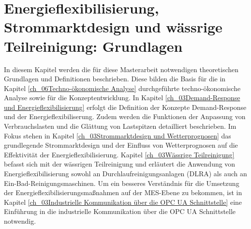 \chapter{Energieflexibilisierung, Strommarktdesign und wässrige Teilreinigung: Grundlagen}
\label{ch_03Energieflexibilisierung, Strommarktdesign und wässrige Teilreinigung: Grundlagen}

In diesem Kapitel werden die für diese Masterarbeit notwendigen theoretischen Grundlagen und Definitionen beschrieben. Diese bilden die Basis für die in Kapitel \ref{ch_06Techno-ökonomische Analyse} durchgeführte techno-ökonomische Analyse sowie für die Konzeptentwicklung. In Kapitel \ref{ch_03Demand-Response und Energieflexibilisierung} erfolgt die Definition der Konzepte Demand-Response und der Energieflexibiliserung. Zudem werden die Funktionen der Anpassung von Verbrauchslasten und die Glättung von Lastspitzen detailliert beschrieben. Im Fokus stehen in Kapitel \ref{ch_03Strommarktdesign und Wetterprognosen} das grundlegende Strommarktdesign und der Einfluss von Wetterprognosen auf die Effektivität der Energieflexibilisierung. Kapitel \ref{ch_03Wässrige Teilreinigung} befasst sich mit der wässrigen Teilreinigung und erläutert die Anwendung von Energieflexibilisierung sowohl an Durchlaufreinigungsanlagen (DLRA) als auch an Ein-Bad-Reinigungsmaschinen. Um ein besseres Verständnis für die Umsetzung der Energieflexibilisierungsmaßnahmen auf der MES-Ebene zu bekommen, ist in Kapitel \ref{ch_03Industrielle Kommunikation über die OPC UA Schnittstelle} eine Einführung in die industrielle Kommunikation über die OPC UA Schnittstelle notwendig.








